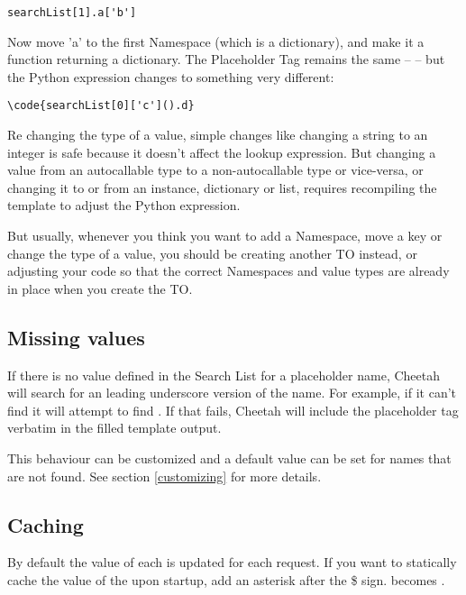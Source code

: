 \begin{verbatim}
searchList[1].a['b']
\end{verbatim}

Now move 'a' to the first Namespace (which is a dictionary), and make it a 
function returning a dictionary.  The Placeholder Tag remains the same --
 -- but the Python expression changes to something very different:

\begin{verbatim}
\code{searchList[0]['c']().d}
\end{verbatim}

Re changing the type of a value, simple changes like changing a string to an
integer is safe because it doesn't affect the lookup expression.  But 
changing a value from an autocallable type to a non-autocallable type or 
vice-versa, or changing it to or from an instance, dictionary or list, requires
recompiling the template to adjust the Python expression.

But usually, whenever you think you want to add a Namespace, move a key or
change the type of a value, you should be creating another TO instead, or
adjusting your code so that the correct Namespaces and value types are already
in place when you create the TO.


\subsection{Missing values}

If there is no value defined in the Search List for a placeholder name,
Cheetah will search for an leading underscore version of the name.  For
example, if it can't find  it will attempt to find
.  If that fails, Cheetah will include the placeholder
tag verbatim in the filled template output.

This behaviour can be customized and a default value can be set for names
that are not found. See section \ref{customizing} for more details.


\subsection{Caching}

By default the value of each  is updated for each request.
If you want to statically cache the value of the  upon
startup, add an asterisk after the \$ sign.   becomes .

